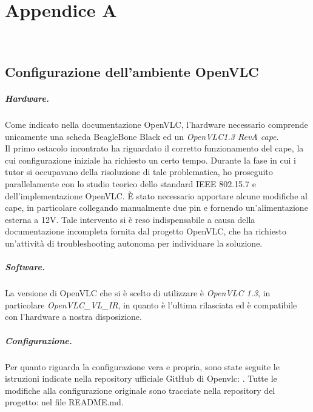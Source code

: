 \chapter{Appendice A}
\label{app:A}

\\

\section{Configurazione dell'ambiente OpenVLC}

\paragraph{Hardware.} Come indicato nella documentazione OpenVLC, l'hardware necessario comprende unicamente una scheda BeagleBone Black ed un \textit{OpenVLC1.3 RevA cape}.\\
Il primo ostacolo incontrato ha riguardato il corretto funzionamento del cape, la cui configurazione iniziale ha richiesto un certo tempo. Durante la fase in cui i tutor si occupavano della risoluzione di tale problematica, ho proseguito parallelamente con lo studio teorico dello standard IEEE 802.15.7 e dell'implementazione OpenVLC. È stato necessario apportare alcune modifiche al cape, in particolare collegando manualmente due pin e fornendo un'alimentazione esterna a 12V. Tale intervento si è reso indispensabile a causa della documentazione incompleta fornita dal progetto OpenVLC, che ha richiesto un'attività di troubleshooting autonoma per individuare la soluzione.
\paragraph{Software.} La versione di OpenVLC che si è scelto di utilizzare è \textit{OpenVLC 1.3}, in particolare \textit{OpenVLC\_VL\_IR}, in quanto è l'ultima rilasciata ed è compatibile con l'hardware a nostra disposizione.

\paragraph{Configurazione.} Per quanto riguarda la configurazione vera e propria, sono state seguite le istruzioni indicate nella repository ufficiale GitHub di Openvlc: \cite{site:openvlc-github}. Tutte le modifiche alla configurazione originale sono tracciate nella repository del progetto: \cite{site:openvlc-pa-github} nel file README.md.

